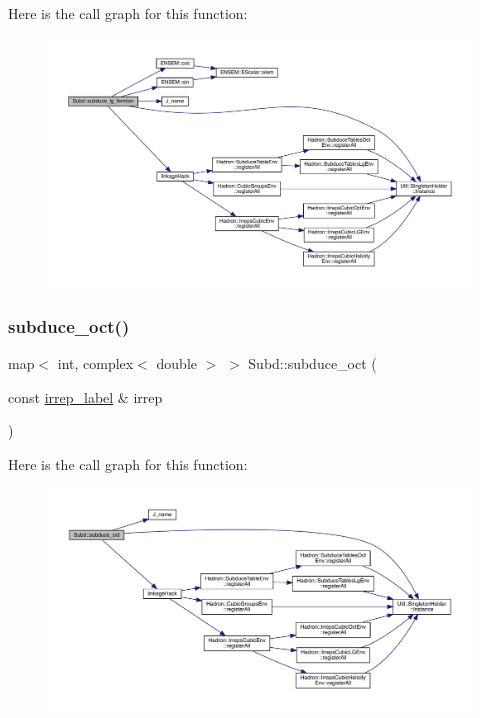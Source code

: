 Here is the call graph for this function\+:
\nopagebreak
\begin{figure}[H]
\begin{center}
\leavevmode
\includegraphics[width=350pt]{d8/d2b/namespaceSubd_ae7ed68270fb8f7b5f574db245b085586_cgraph}
\end{center}
\end{figure}
\mbox{\label{namespaceSubd_aa8b77162377de658856d44a4ac5aad26}} 
\subsubsection{\texorpdfstring{subduce\_oct()}{subduce\_oct()}}
{\footnotesize\ttfamily map$<$ int, complex$<$ double $>$ $>$ Subd\+::subduce\+\_\+oct (\begin{DoxyParamCaption}\item[{const \mbox{\hyperlink{structirrep__label}{irrep\+\_\+label}} \&}]{irrep }\end{DoxyParamCaption})}

Here is the call graph for this function\+:
\nopagebreak
\begin{figure}[H]
\begin{center}
\leavevmode
\includegraphics[width=350pt]{d8/d2b/namespaceSubd_aa8b77162377de658856d44a4ac5aad26_cgraph}
\end{center}
\end{figure}
\mbox{\label{namespaceSubd_a859ba9599493e5fa5957acedc92dd964}} 
